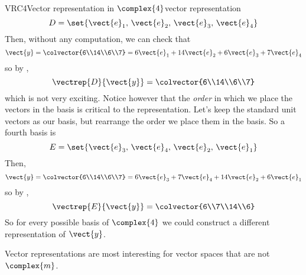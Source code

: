 \begin{example}{VRC4}{Vector representation in $\complex{4}$}{vector representation}
\begin{equation*}
D=\set{\vect{e}_1,\,\vect{e}_2,\,\vect{e}_3,\,\vect{e}_4}
\end{equation*}
%
Then, without any computation, we can check that
%
\begin{equation*}
\vect{y}=\colvector{6\\14\\6\\7}=6\vect{e}_1+14\vect{e}_2+6\vect{e}_3+7\vect{e}_4
\end{equation*}
%
so by ,
%
\begin{equation*}
\vectrep{D}{\vect{y}}=\colvector{6\\14\\6\\7}
\end{equation*}
%
which is not very exciting.  Notice however that the {\em order} in which we place the vectors in the basis is critical to the representation.  Let's keep the standard unit vectors as our basis, but rearrange the order we place them in the basis.  So a fourth basis is
%
\begin{equation*}
E=\set{\vect{e}_3,\,\vect{e}_4,\,\vect{e}_2,\,\vect{e}_1}
\end{equation*}
%
Then, 
%
\begin{equation*}
\vect{y}=\colvector{6\\14\\6\\7}=6\vect{e}_3+7\vect{e}_4+14\vect{e}_2+6\vect{e}_1
\end{equation*}
%
so by ,
%
\begin{equation*}
\vectrep{E}{\vect{y}}=\colvector{6\\7\\14\\6}
\end{equation*}
%
So for every possible basis of $\complex{4}$ we could construct a different representation of $\vect{y}$.
%
\end{example}
%
Vector representations are most interesting for vector spaces that are not $\complex{m}$.
%
